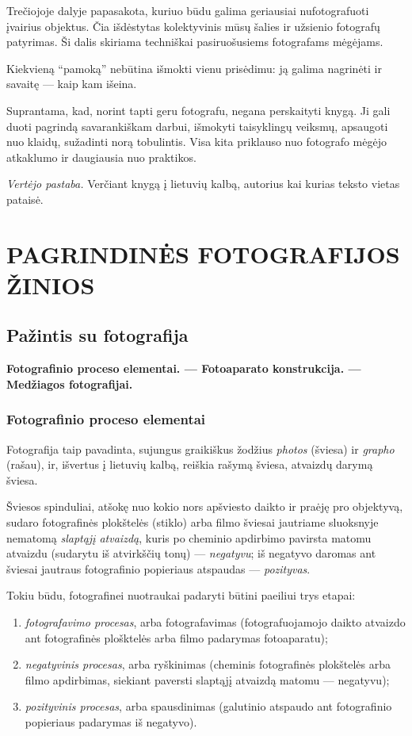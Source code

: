 \documentclass[12pt]{book}
\begin{document}
		Trečiojoje dalyje papasakota, kuriuo būdu galima geriausiai nufotografuoti įvairius objektus. Čia išdėstytas kolektyvinis mūsų šalies ir užsienio fotografų patyrimas. Ši dalis skiriama techniškai pasiruošusiems fotografams mėgėjams.

		Kiekvieną ``pamoką'' nebūtina išmokti vienu prisėdimu: ją galima nagrinėti ir savaitę --- kaip kam išeina.

		Suprantama, kad, norint tapti geru fotografu, negana perskaityti knygą. Ji gali duoti pagrindą savarankiškam darbui, išmokyti taisyklingų veiksmų, apsaugoti nuo klaidų, sužadinti norą tobulintis. Visa kita priklauso nuo fotografo mėgėjo atkaklumo ir daugiausia nuo praktikos.

		\textit{Vertėjo pastaba.} Verčiant knygą į lietuvių kalbą, autorius kai kurias teksto vietas pataisė.
	\part{PAGRINDINĖS FOTOGRAFIJOS ŽINIOS}
	\setcounter{section}{0}
	\chapter{Pažintis su fotografija}
		\textbf{Fotografinio proceso elementai. --- Fotoaparato konstrukcija. --- Medžiagos fotografijai.}
		\section*{Fotografinio proceso elementai}
			Fotografija taip pavadinta, sujungus graikiškus žodžius \textit{photos} (šviesa) ir \textit{grapho} (rašau), ir, išvertus į lietuvių kalbą, reiškia rašymą šviesa, atvaizdų darymą šviesa.

			Šviesos spinduliai, atšokę nuo kokio nors apšviesto daikto ir praėję pro objektyvą, sudaro fotografinės plokštelės (stiklo) arba filmo šviesai jautriame sluoksnyje nematomą \textit{slaptąjį atvaizdą}, kuris po cheminio apdirbimo pavirsta matomu atvaizdu (sudarytu iš atvirkščių tonų) --- \textit{negatyvu}; iš negatyvo daromas ant šviesai jautraus fotografinio popieriaus atspaudas --- \textit{pozityvas}.

			Tokiu būdu, fotografinei nuotraukai padaryti būtini paeiliui trys etapai:
			\begin{enumerate}[1)]
				\item \textit{fotografavimo procesas}, arba fotografavimas (fotografuojamojo daikto atvaizdo ant fotografinės plošktelės arba filmo padarymas fotoaparatu);
				\item \textit{negatyvinis procesas}, arba ryškinimas (cheminis fotografinės plokštelės arba filmo apdirbimas, siekiant paversti slaptąjį atvaizdą matomu --- negatyvu);
				\item \textit{pozityvinis procesas}, arba spausdinimas (galutinio atspaudo ant fotografinio popieriaus padarymas iš negatyvo).
			\end{enumerate}
\end{document}

